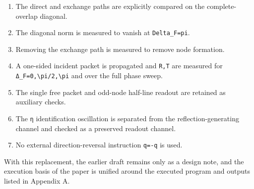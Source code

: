 \documentclass[
  a4paper,
]{article}
\providecommand{\tightlist}{%
  \setlength{\itemsep}{0pt}\setlength{\parskip}{0pt}}
\begin{document}
\begin{enumerate}
\def\labelenumi{\arabic{enumi}.}
\tightlist
\item
  The direct and exchange paths are explicitly compared on the
  complete-overlap diagonal.
\item
  The diagonal norm is measured to vanish at \texttt{Delta\_F=pi}.
\item
  Removing the exchange path is measured to remove node formation.
\item
  A one-sided incident packet is propagated and \texttt{R,T} are
  measured for \texttt{Δ\_F=0,\textbackslash{}pi/2,\textbackslash{}pi}
  and over the full phase sweep.
\item
  The single free packet and odd-node half-line readout are retained as
  auxiliary checks.
\item
  The \texttt{η} identification oscillation is separated from the
  reflection-generating channel and checked as a preserved readout
  channel.
\item
  No external direction-reversal instruction \texttt{q=-q} is used.
\end{enumerate}

With this replacement, the earlier draft remains only as a design note,
and the execution basis of the paper is unified around the executed
program and outputs listed in Appendix A.
\end{document}
